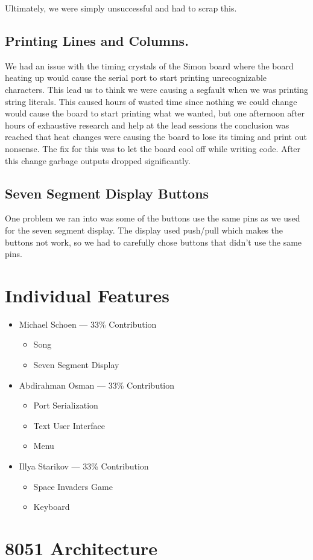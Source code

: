 \documentclass[12pt]{article}
\begin{document}
Ultimately, we were simply unsuccessful and had to scrap this.

\subsection{Printing Lines and Columns.}
We had an issue with the timing crystals of the Simon board where the board heating up would cause the serial port to start printing unrecognizable characters. This lead us to think we were causing a segfault when we was printing string literals. This caused hours of wasted time since nothing we could change would cause the board to start printing what we wanted, but one afternoon after hours of exhaustive research and help at the lead sessions the conclusion was reached that heat changes were causing the board to lose its timing and print out nonsense. The fix for this was to let the board cool off while writing code. After this change garbage outputs dropped significantly.

\subsection{Seven Segment Display Buttons}
One problem we ran into was some of the buttons use the same pins as we used for the seven segment display. The display used push/pull which makes the buttons not work, so we had to carefully chose buttons that didn't use the same pins.

\section{Individual Features}
\begin{itemize}
    \item Michael Schoen --- 33\% Contribution
    \begin{itemize}
        \item Song
        \item Seven Segment Display
    \end{itemize}

    \item Abdirahman Osman --- 33\% Contribution
    \begin{itemize}
        \item Port Serialization
        \item Text User Interface
        \item Menu
    \end{itemize}

    \item Illya Starikov --- 33\% Contribution
    \begin{itemize}
        \item Space Invaders Game
        \item Keyboard
    \end{itemize}
\end{itemize}

\section{8051 Architecture}
\end{document}
